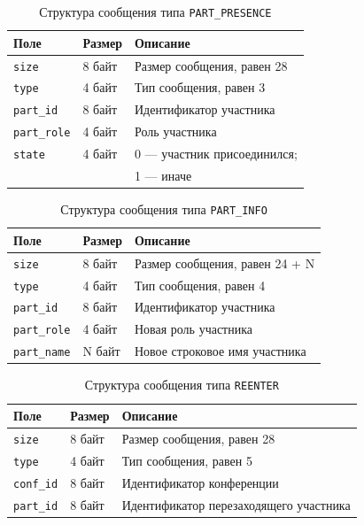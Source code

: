 \begin{table}[H]
  \centering
  \caption{Структура сообщения типа \texttt{PART\_PRESENCE}}
  \label{tbl:msg:part-presence}
  \begin{tabular}{|l|l|l|}
    \hline
    \textbf{Поле} & \textbf{Размер} & \textbf{Описание} \\ \hline
    \texttt{size} & 8 байт & Размер сообщения, равен 28 \\ \hline
    \texttt{type} & 4 байт & Тип сообщения, равен 3 \\ \hline
    \texttt{part\_id} & 8 байт & Идентификатор участника \\ \hline
    \texttt{part\_role} & 4 байт & Роль участника \\ \hline
    \texttt{state} & 4 байт & 0 --- участник присоединился; \\
    & & 1 --- иначе \\ \hline
  \end{tabular}
\end{table}

\begin{table}[H]
  \centering
  \caption{Структура сообщения типа \texttt{PART\_INFO}}
  \label{tbl:msg:part-info}
  \begin{tabular}{|l|l|l|}
    \hline
    \textbf{Поле} & \textbf{Размер} & \textbf{Описание} \\ \hline
    \texttt{size} & 8 байт & Размер сообщения, равен 24 + N \\ \hline
    \texttt{type} & 4 байт & Тип сообщения, равен 4 \\ \hline
    \texttt{part\_id} & 8 байт & Идентификатор участника \\ \hline
    \texttt{part\_role} & 4 байт & Новая роль участника \\ \hline
    \texttt{part\_name} & N байт & Новое строковое имя участника \\ \hline
  \end{tabular}
\end{table}

\begin{table}[H]
  \centering
  \caption{Структура сообщения типа \texttt{REENTER}}
  \label{tbl:msg:reenter}
  \begin{tabular}{|l|l|l|}
    \hline
    \textbf{Поле} & \textbf{Размер} & \textbf{Описание} \\ \hline
    \texttt{size} & 8 байт & Размер сообщения, равен 28 \\ \hline
    \texttt{type} & 4 байт & Тип сообщения, равен 5 \\ \hline
    \texttt{conf\_id} & 8 байт & Идентификатор конференции \\ \hline
    \texttt{part\_id} & 8 байт & Идентификатор перезаходящего участника \\ \hline
  \end{tabular}
\end{table}

